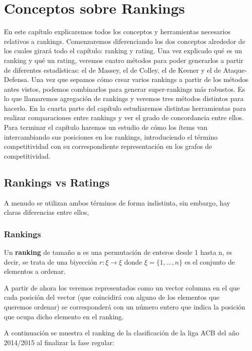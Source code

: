 \chapter{Conceptos sobre Rankings}
En este capítulo explicaremos todos los conceptos y herramientas necesarios relativos a rankings. Comenzaremos diferenciando los dos conceptos alrededor de los cuales girará todo el capítulo: ranking y rating. Una vez explicado qué es un ranking y qué un rating, veremos cuatro métodos para poder generarlos a partir de diferentes estadísticas: el de Massey, el de Colley, el de Keener y el de Ataque-Defensa. Una vez que sepamos cómo crear varios rankings a partir de los métodos antes vistos, podemos combinarlos para generar super-rankings más robustos. Es lo que llamaremos agregación de rankings y veremos tres métodos distintos para hacerlo. En la cuarta parte del capítulo estudiaremos distintas herramientas para realizar comparaciones entre rankings y ver el grado de concordancia entre ellos. Para terminar el capítulo haremos un estudio de cómo los ítems van intercambiando sus posiciones en los rankings, introduciendo el término competitividad con su correspondiente representación en los grafos de competitividad. 

\section{Rankings vs Ratings}
A menudo se utilizan ambos términos de forma indistinta, sin embargo, hay claras diferencias entre ellos, \cite{cap1}

\subsection{Rankings}
\begin{defi} 
	Un \textbf{ranking} de tamaño n es una permutación de enteros desde 1 hasta n, es decir, se trata de una biyección $r: \xi \rightarrow \xi$ donde $\xi = \{1,...,n\}$ es el conjunto de elementos a ordenar.
\end{defi}
A partir de ahora los veremos representados como un vector columna en el que cada posición del vector (que coincidirá con alguno de los elementos que queremos ordenar) se corresponderá con un número entero que indica la posición que ocupa dicho elemento en el ranking. 
 
\newpage 
 
\begin{ejem} \label{ejem1}
A continuación se muestra el ranking de la clasificación de la liga ACB del año 2014/2015 al finalizar la fase regular:
\end{ejem}
	
